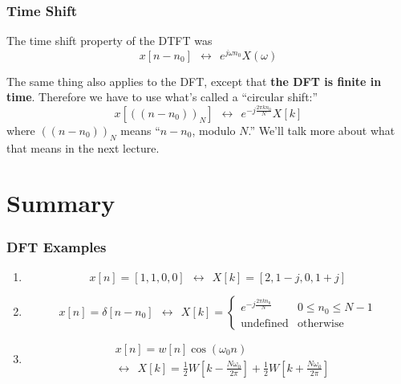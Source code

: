 \documentclass{beamer}
\begin{document}
\begin{frame}
  \frametitle{Time Shift}

  The time shift property of the DTFT was
  \begin{displaymath}
    x[n-n_0]~~\leftrightarrow~~e^{j\omega n_0}X(\omega)
  \end{displaymath}

  The same thing also applies to the DFT, except that {\bf the DFT is
    finite in time}.  Therefore we have to use what's called a ``circular shift:''
  \begin{displaymath}
    x\left[((n-n_0))_N\right]~~\leftrightarrow~~e^{-j\frac{2\pi kn_0}{N}}X[k]
  \end{displaymath}
  where $((n-n_0))_N$ means ``$n-n_0$, modulo $N$.''  We'll talk more
  about what that means in the next lecture.
\end{frame}


\section[Summary]{Summary}
\setcounter{subsection}{1}


\begin{frame}
  \frametitle{DFT Examples}

  \begin{enumerate}
  \item
    \begin{displaymath}
      x[n]=[1,1,0,0]~~\leftrightarrow~~X[k]=[2,1-j,0,1+j]
    \end{displaymath}
  \item
    \begin{displaymath}
      x[n]=\delta[n-n_0]~~\leftrightarrow~~X[k]=\begin{cases}
      e^{-j\frac{2\pi kn_0}{N}} & 0\le n_0\le N-1\\
      \mbox{undefined} & \mbox{otherwise}
      \end{cases}
    \end{displaymath}
  \item 
    \begin{align*}
      &x[n]=w[n]\cos(\omega_0 n)\\
      &\leftrightarrow~~X[k]=
      \frac{1}{2}W\left[k-\frac{N\omega_0}{2\pi}\right]+
      \frac{1}{2}W\left[k+\frac{N\omega_0}{2\pi}\right]
    \end{align*}
  \end{enumerate}
\end{frame}
\end{document}
